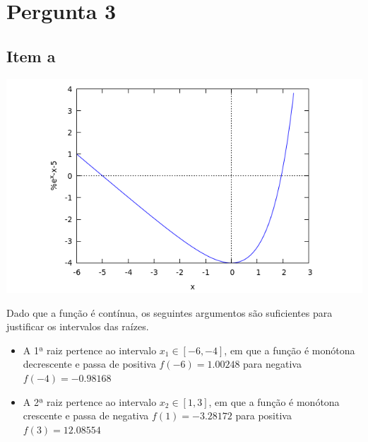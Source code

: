 {\section{Pergunta 3}
\subsection{Item a}

\begin{center} \includegraphics[scale=0.5]{2017E_3_1} \end{center}
Dado que a função é contínua, os seguintes argumentos são suficientes para justificar os intervalos das raízes.
\begin{itemize}
    \item A 1ª raiz pertence ao intervalo $x_1 \in [-6,-4]$, em que a função é monótona decrescente e passa de positiva $f(-6)=1.00248$ para negativa $f(-4)=-0.98168$
    \item A 2ª raiz pertence ao intervalo $x_2 \in [1,3]$, em que a função é monótona crescente e passa de negativa $f(1)=-3.28172$ para positiva $f(3)=12.08554$
\end{itemize}

}

